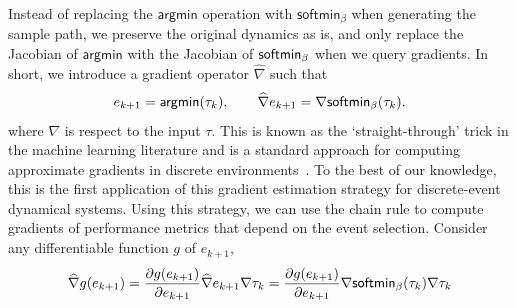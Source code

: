 Instead of replacing the $\mathsf{argmin}$ operation with $\mathsf{softmin}_{\beta}$ when generating the sample path, we preserve the original dynamics as is, and only replace the Jacobian of $\mathsf{argmin}$ with the Jacobian of $\mathsf{softmin}_\beta$ when we query gradients. In short, we introduce a gradient operator $\widehat{\nabla}$ such that
\begin{equation}
e_{k+1}=\mathsf{argmin}(\tau_{k}), \quad \quad
\widehat{\nabla} e_{k+1}= \nabla \mathsf{softmin}_{\beta}(\tau_{k}). 
\end{equation}
where $\nabla$ is respect to the input $\tau$.
This is known as the `straight-through' trick in the machine learning literature and is a standard approach for computing approximate gradients in discrete environments~\cite{bengio2013estimating, van2017neural}. To the best of our knowledge, this is the first application of this gradient estimation strategy for discrete-event dynamical systems. Using this strategy, we can use the chain rule to compute gradients of performance metrics that depend on the event selection. 
Consider any differentiable function $g$ of $e_{k+1}$, 
\[
\widehat{\nabla} g(e_{k+1}) = \frac{\partial g(e_{k+1})}{\partial e_{k+1}} \widehat{\nabla} e_{k+1} \nabla \tau_{k}= \frac{\partial g(e_{k+1})}{\partial e_{k+1}} \nabla \mathsf{softmin}_{\beta}(\tau_{k}) \nabla \tau_{k}
\]
